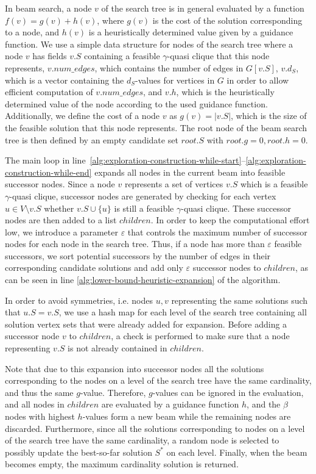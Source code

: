 \documentclass[draft,final]{vutinfth} %
\begin{document}
In beam search, a node $v$ of the search tree is in general evaluated by a function $f(v) = g(v) + h(v)$, where $g(v)$ is the cost of the solution corresponding to a node, and $h(v)$ is a heuristically determined value given by a guidance function. 
We use a simple data structure for nodes of the search tree where a node $v$ has fields $\mathit{v.S}$ containing a feasible $\gamma$-quasi clique that this node represents, $\mathit{v.num\_edges}$, which contains the number of edges in $G[v.S]$, $\mathit{v.d_S}$, which is a vector containing the $d_S$-values for vertices in $G$ in order to allow efficient computation of $\mathit{v.num\_edges}$, and $\mathit{v.h}$, which is the heuristically determined value of the node according to the used guidance function.
Additionally, we define the cost of a node $v$ as $g(v) = |v.S|$, which is the size of the feasible solution that this node represents.  
The root node of the beam search tree is then defined by an empty candidate set $\mathit{root.S}$ with $\mathit{root.g}=0, \mathit{root.h}=0$. 

The main loop in line~\ref{alg:exploration-construction-while-start}--\ref{alg:exploration-construction-while-end} expands all nodes in the current beam into feasible successor nodes. 
Since a node $v$ represents a set of vertices $\mathit{v.S}$ which is a feasible $\gamma$-quasi clique, successor nodes are generated by checking for each vertex $u \in V \setminus \mathit{v.S}$ whether $\mathit{v.S} \cup \{u\}$ is still a feasible $\gamma$-quasi clique. 
These successor nodes are then added to a list $\mathit{children}$. 
In order to keep the computational effort low, we introduce a parameter $\varepsilon$ that controls the maximum number of successor nodes for each node in the search tree. Thus, if a node has more than $\varepsilon$ feasible successors, we sort potential successors by the number of edges in their corresponding candidate solutions and add only $\varepsilon$ successor nodes to $\mathit{children}$, as can be seen in line \ref{alg:lower-bound-heuristic-expansion} of the algorithm. 

In order to avoid symmetries, i.e. nodes $u,v$ representing the same solutions such that $u.S = v.S$, we use a hash map for each level of the search tree containing all solution vertex sets that were already added for expansion. Before adding a successor node $v$ to $\mathit{children}$, a check is performed to make sure that a node representing $v.S$ is not already contained in $\mathit{children}$. 

Note that due to this expansion into successor nodes all the solutions corresponding to the nodes on a level of the search tree have the same cardinality, and thus the same $g$-value.  
Therefore, $g$-values can be ignored in the evaluation, and all nodes in $\mathit{children}$ are evaluated by a guidance function $h$, and the $\beta$ nodes with highest $h$-values form a new beam while the remaining nodes are discarded. 
Furthermore, since all the solutions corresponding to nodes on a level of the search tree have the same cardinality, a random node is selected to possibly update the best-so-far solution $S^*$ on each level.
Finally, when the beam becomes empty, the maximum cardinality solution is returned. 
\end{document}

